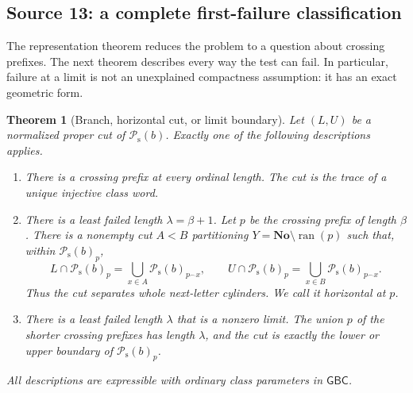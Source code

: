 \documentclass[11pt]{article}
\newtheorem{theorem}{Theorem}[section]
\theoremstyle{definition}
\theoremstyle{remark}
\newcommand{\No}{\mathbf{No}}
\newcommand{\Psupp}{\mathcal P_{\mathrm{s}}}
\newcommand{\ran}{\operatorname{ran}}
\newcommand{\cat}{\mathbin{{}^\frown}}
\newcommand{\GBC}{\mathsf{GBC}}
\begin{document}
\subsection{Source 13: a complete first-failure classification}\label{swo:fs:sec:failure}

The representation theorem reduces the problem to a question about
crossing prefixes. The next theorem describes every way the test can
fail. In particular, failure at a limit is not an unexplained
compactness assumption: it has an exact geometric form.

\begin{theorem}[Branch, horizontal cut, or limit boundary]\label{swo:fs:thm:failure}
Let $(L,U)$ be a normalized proper cut of $\Psupp(b)$. Exactly one of the
following descriptions applies.
\begin{enumerate}[label=\textup{(\roman*)}]
\item There is a crossing prefix at every ordinal length. The cut is
the trace of a unique injective class word.
\item There is a least failed length $\lambda=\beta+1$. Let $p$ be
the crossing prefix of length $\beta$. There is a nonempty cut
$A<B$ partitioning $Y=\No\setminus\ran(p)$ such that, within $\Psupp(b)_p$,
\[
 L\cap \Psupp(b)_p=\bigcup_{x\in A}\Psupp(b)_{p\cat x},\qquad
 U\cap \Psupp(b)_p=\bigcup_{x\in B}\Psupp(b)_{p\cat x}.
\]
Thus the cut separates whole next-letter cylinders. We call it
\emph{horizontal at $p$}.
\item There is a least failed length $\lambda$ that is a nonzero
limit. The union $p$ of the shorter crossing prefixes has length
$\lambda$, and the cut is exactly the lower or upper boundary of
$\Psupp(b)_p$.
\end{enumerate}
All descriptions are expressible with ordinary class parameters in
$\GBC$.
\end{theorem}
\end{document}
